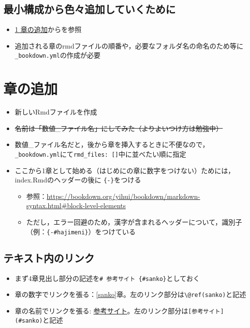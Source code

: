 \documentclass[xelatex,ja=standard]{bxjsbook}
\providecommand{\tightlist}{%
  \setlength{\itemsep}{0pt}\setlength{\parskip}{0pt}}
\begin{document}
\hypertarget{hajime_add}{%
\subsection*{最小構成から色々追加していくために}\label{hajime_add}}

\begin{itemize}
\tightlist
\item
  \protect\hyperlink{intro}{1 章の追加}からを参照
\item
  追加される章のrmdファイルの順番や，必要なフォルダ名の命名のため等に\texttt{\_bookdown.yml}の作成が必要
\end{itemize}

\hypertarget{intro}{%
\section{章の追加}\label{intro}}

\begin{itemize}
\tightlist
\item
  新しいRmdファイルを作成
\item
  \sout{名前は「数値\_ファイル名」にしてみた（よりよいつけ方は勉強中）}
\item
  数値\_ファイル名だと，後から章を挿入するときに不便なので，\texttt{\_bookdown.yml}にて\texttt{rmd\_files:\ {[}{]}}中に並べたい順に指定
\item
  ここから1章として始める（はじめにの章に数字をつけない）ためには，index.Rmdのヘッダーの後に \texttt{\{-\}}をつける

  \begin{itemize}
  \tightlist
  \item
    参照：\url{https://bookdown.org/yihui/bookdown/markdown-syntax.html\#block-level-elements}
  \item
    ただし，エラー回避のため，漢字が含まれるヘッダーについて，識別子（例：\texttt{\{-\#hajimeni\}}）をつけている
  \end{itemize}
\end{itemize}

\hypertarget{intro_link}{%
\subsection{テキスト内のリンク}\label{intro_link}}

\begin{itemize}
\tightlist
\item
  まず4章見出し部分の記述を\texttt{\#\ 参考サイト\ \{\#sanko\}}としておく
\item
  章の数字でリンクを張る：\ref{sanko}章。左のリンク部分は\texttt{\textbackslash{}@ref(sanko)}と記述
\item
  章の名前でリンクを張る:
  \protect\hyperlink{sanko}{参考サイト}。左のリンク部分は\texttt{{[}参考サイト{]}(\#sanko)}と記述
\end{itemize}
\end{document}
